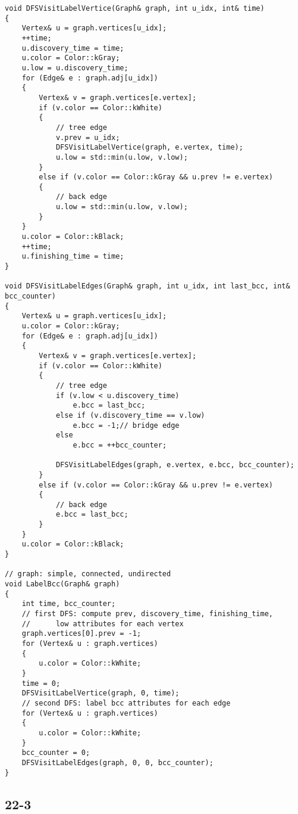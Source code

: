 \begin{verbatim}
void DFSVisitLabelVertice(Graph& graph, int u_idx, int& time)
{
    Vertex& u = graph.vertices[u_idx];
    ++time;
    u.discovery_time = time;
    u.color = Color::kGray;
    u.low = u.discovery_time;
    for (Edge& e : graph.adj[u_idx])
    {
        Vertex& v = graph.vertices[e.vertex];
        if (v.color == Color::kWhite)
        {
            // tree edge
            v.prev = u_idx;
            DFSVisitLabelVertice(graph, e.vertex, time);
            u.low = std::min(u.low, v.low);
        }
        else if (v.color == Color::kGray && u.prev != e.vertex)
        {
            // back edge
            u.low = std::min(u.low, v.low);
        }
    }
    u.color = Color::kBlack;
    ++time;
    u.finishing_time = time;
}

void DFSVisitLabelEdges(Graph& graph, int u_idx, int last_bcc, int& bcc_counter)
{
    Vertex& u = graph.vertices[u_idx];
    u.color = Color::kGray;
    for (Edge& e : graph.adj[u_idx])
    {
        Vertex& v = graph.vertices[e.vertex];
        if (v.color == Color::kWhite)
        {
            // tree edge
            if (v.low < u.discovery_time)
                e.bcc = last_bcc;
            else if (v.discovery_time == v.low)
                e.bcc = -1;// bridge edge
            else
                e.bcc = ++bcc_counter;
            
            DFSVisitLabelEdges(graph, e.vertex, e.bcc, bcc_counter);
        }
        else if (v.color == Color::kGray && u.prev != e.vertex)
        {
            // back edge
            e.bcc = last_bcc;
        }
    }
    u.color = Color::kBlack;
}

// graph: simple, connected, undirected
void LabelBcc(Graph& graph)
{
    int time, bcc_counter;
    // first DFS: compute prev, discovery_time, finishing_time, 
    //      low attributes for each vertex
    graph.vertices[0].prev = -1;
    for (Vertex& u : graph.vertices)
    {
        u.color = Color::kWhite;
    }
    time = 0;
    DFSVisitLabelVertice(graph, 0, time);
    // second DFS: label bcc attributes for each edge
    for (Vertex& u : graph.vertices)
    {
        u.color = Color::kWhite;
    }
    bcc_counter = 0;
    DFSVisitLabelEdges(graph, 0, 0, bcc_counter);
}
\end{verbatim}

\subsection*{22-3}

